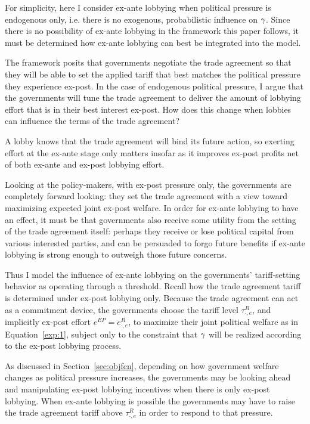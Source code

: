 For simplicity, here I consider ex-ante lobbying when political pressure is endogenous only, i.e. there is no exogenous, probabilistic influence on $\gamma$. Since there is no possibility of ex-ante lobbying in the \Textcite{bs2005} framework this paper follows, it must be determined how ex-ante lobbying can best be integrated into the model.

The \Textcite{bs2005} framework posits that governments negotiate the trade agreement so that they will be able to set the applied tariff that best matches the political pressure they experience ex-post. In the case of endogenous political pressure, I argue that the governments will tune the trade agreement to deliver the amount of lobbying effort that is in their best interest ex-post. How does this change when lobbies can influence the terms of the trade agreement?

A lobby knows that the trade agreement will bind its future action, so exerting effort at the ex-ante stage only matters insofar as it improves ex-post profits net of both ex-ante and ex-post lobbying effort.

Looking at the policy-makers, with ex-post pressure only, the governments are completely forward looking: they set the trade agreement with a view toward maximizing expected joint ex-post welfare. In order for ex-ante lobbying to have an effect, it must be that governments also receive some utility from the setting of the trade agreement itself: perhaps they receive or lose political capital from various interested parties, and can be persuaded to forgo future benefits if ex-ante lobbying is strong enough to outweigh those future concerns. 

Thus I model the influence of ex-ante lobbying on the governments' tariff-setting behavior as operating through a threshold. Recall how the trade agreement tariff is determined under ex-post lobbying only. Because the trade agreement can act as a commitment device, the governments choose the tariff level $\tau^R_{\cdot,e}$, and implicitly ex-post effort $e^{EP}=e^R_{\cdot,e}$, to maximize their joint political welfare as in Equation~\ref{exp:1}, subject only to the constraint that $\gamma$ will be realized according to the ex-post lobbying process.
		
As discussed in Section~\ref{sec:objfcn}, depending on how government welfare changes as political pressure increases, the governments may be looking ahead and manipulating ex-post lobbying incentives when there is only ex-post lobbying. When ex-ante lobbying is possible the governments may have to raise the trade agreement tariff above $\tau^R_{\cdot,e}$ in order to respond to that pressure.

